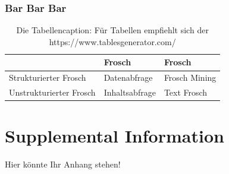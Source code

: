\documentclass[
	12pt,
    a4paper,
    egregdoesnotlikesansseriftitles, %
    toc=chapterentrywithdots,
    oneside, openany,
    titlepage,
    parskip=half,
    headings=normal,  %
    listof=totoc,
    bibliography=totoc,
    index=totoc,
    captions=tableheading,  %
    listof=flat,
    numbers=noenddot, %
    final]
    {scrbook}
\begin{document}
\subsection{Bar Bar Bar}
\blindtext
	\begin{table}[h]
	\centering
		\begin{tabular}{l|l|l}
		                        & Frosch         & Frosch        \\ \hline
		Strukturierter Frosch   & Datenabfrage   & Frosch Mining \\ \hline
		Unstrukturierter Frosch & Inhaltsabfrage & Text Frosch
		\end{tabular}%
	\caption[Eine Tabelle über Frösche]{Die Tabellencaption: Für Tabellen empfiehlt sich der https://www.tablesgenerator.com/}
	\label{tab:frosch_tabelle_1}
	\end{table}
\blindtext

\backmatter

\printnoidxglossaries


%

\clearpage %


\appendix
\chapter{Supplemental Information}\label{app:supplemental-information}
Hier könnte Ihr Anhang stehen!


\end{document}
